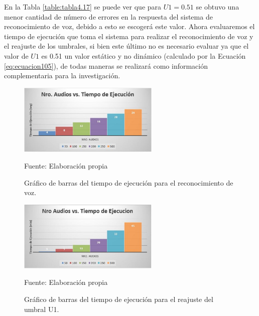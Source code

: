 En la Tabla \ref{table:tabla4.17} se puede ver que para $U1 = 0.51$ se obtuvo una menor cantidad de número de errores en la respuesta del sistema de reconocimiento de voz, debido a esto se escogerá este valor.
\vskip 0.5cm
Ahora evaluaremos el tiempo de ejecución que toma el sistema para realizar el reconocimiento de voz y el reajuste de los umbrales, si bien este último no es necesario evaluar ya que el valor de $U1$ es 0.51 un valor estático y no dinámico (calculado por la Ecuación \eqref{eq:ecuacion105}), de todas maneras se realizará como información complementaria para la investigación.

\vskip 0.5cm
\begin{figure}[H]
\captionsetup{justification=centering}
\begin{center}
\includegraphics[width=0.6\textwidth]{Imagenes/Cap4/image005}
\end{center}
\begin{center}
\vskip -0.5cm
\caption{\small{Gráfico de barras del tiempo de ejecución para el reconocimiento de voz.}}
\label{fig:figura4.5}
{\small{Fuente: Elaboración propia}}
\end{center}
\end{figure}

\begin{figure}[H]
\captionsetup{justification=centering}
\begin{center}
\includegraphics[width=0.6\textwidth]{Imagenes/Cap4/image006}
\end{center}
\begin{center}
\vskip -0.5cm
\caption{\small{Gráfico de barras del tiempo de ejecución para el reajuste del umbral U1.}}
\label{fig:figura4.6}
{\small{Fuente: Elaboración propia}}
\end{center}
\end{figure}

